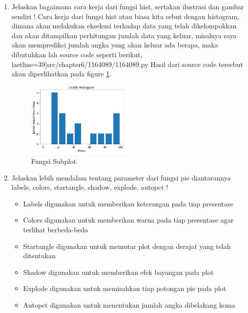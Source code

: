 \begin{enumerate}
\item Jelaskan bagaimana cara kerja dari fungsi hist, sertakan ilustrasi dan gambar sendiri !
	\subitem Cara kerja dari fungsi hist atau biasa kita sebut dengan histogram, dimana akan melakukan eksekusi terhadap data yang telah dikelompokkan dan akan ditampilkan perhitungan jumlah data yang keluar, misalnya saya akan memprediksi jumlah angka yang akan keluar ada berapa, maka dibutuhkan lah source code seperti berikut,
	 lastline=39]{src/chapter6/1164089/1164089.py}
Hasil dari source code tersebut akan diperlihatkan pada figure \ref{YNC6-10}.

		\begin{figure}[!htbp!]
			\centerline{\includegraphics[width=0.5\textwidth]{figures/chapter6/1164089/YNC6-10.png}}
			\caption{Fungsi Subplot.}
			\label{YNC6-10}
		\end{figure}

\item Jelaskan lebih mendalam tentang parameter dari fungsi pie diantarannya labels, colors, startangle, shadow, explode, autopct !

	\begin{itemize}
		\item Labels digunakan untuk memberikan keterangan pada tiap presentase
		\item Colors digunakan untuk memberikan warna pada tiap presentase agar terlihat berbeda-beda
		\item Startangle digunakan untuk memutar plot dengan derajat yang telah ditentukan
		\item Shadow digunakan untuk memberikan efek bayangan pada plot
		\item Explode digunakan untuk memisahkan tiap potongan pie pada plot
		\item Autopct digunakan untuk menentukan jumlah angka dibelakang koma
	\end{itemize}

\end{enumerate}

